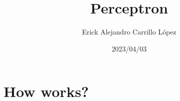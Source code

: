 \documentclass[12pt]{article}
\title{Perceptron}
\author{Erick Alejandro Carrillo López}
\date{2023/04/03}
\begin{document}
\maketitle
\tableofcontents
\newpage
\section{How works?}
\end{document}
